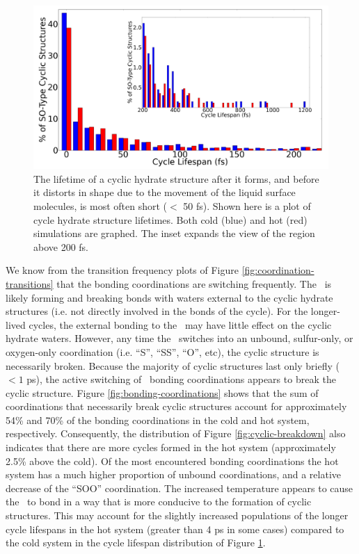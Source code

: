\documentclass{article}
\begin{document}
\begin{figure}[h!]
	\begin{center}
		\includegraphics[scale=1.0]{cycle-lifespans.png}
		\caption{The lifetime of a cyclic hydrate structure after it forms, and before it distorts in shape due to the movement of the liquid surface molecules, is most often short ($<$ 50 fs). Shown here is a plot of cycle hydrate structure lifetimes. Both cold (blue) and hot (red) simulations are graphed. The inset expands the view of the region above 200 fs.}
		\label{fig:cycle-lifespans}
	\end{center}
\end{figure}

We know from the transition frequency plots of Figure \ref{fig:coordination-transitions} that the bonding coordinations are switching frequently. The \suldiox~is likely forming and breaking bonds with waters external to the cyclic hydrate structures (i.e. not directly involved in the bonds of the cycle). For the longer-lived cycles, the external bonding to the \suldiox~may have little effect on the cyclic hydrate waters. However, any time the \suldiox~switches into an unbound, sulfur-only, or oxygen-only coordination (i.e. ``S'', ``SS'', ``O'', etc), the cyclic structure is necessarily broken. Because the majority of cyclic structures last only briefly ($<1$ ps), the active switching of \suldiox~bonding coordinations appears to break the cyclic structure. Figure \ref{fig:bonding-coordinations} shows that the sum of coordinations that necessarily break cyclic structures account for approximately 54\% and 70\% of the bonding coordinations in the cold and hot system, respectively. Consequently, the distribution of Figure \ref{fig:cyclic-breakdown} also indicates that there are more cycles formed in the hot system (approximately 2.5\% above the cold). Of the most encountered bonding coordinations the hot system has a much higher proportion of unbound coordinations, and a relative decrease of the ``SOO'' coordination. The increased temperature appears to cause the \suldiox~to bond in a way that is more conducive to the formation of cyclic structures. This may account for the slightly increased populations of the longer cycle lifespans in the hot system (greater than 4 ps in some cases) compared to the cold system in the cycle lifespan distribution of Figure \ref{fig:cycle-lifespans}. 
\end{document}
